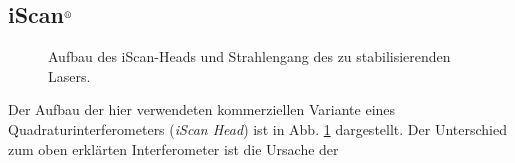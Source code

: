 \subsection{iScan$^\text{\textregistered}$}\label{subsec:iScan}
\begin{figure}[h]
 	\centering
	\caption[iScan-Head - Aufbau]{Aufbau
	des iScan-Heads und Strahlengang des zu
	stabilisierenden Lasers.}\label{fig:iscan_aufbau}
\end{figure}
Der Aufbau der hier verwendeten kommerziellen Variante eines
Quadraturinterferometers (\textit{iScan Head}) ist in Abb.
\ref{fig:iscan_aufbau} dargestellt.
Der Unterschied zum oben erklärten Interferometer ist die Ursache der
